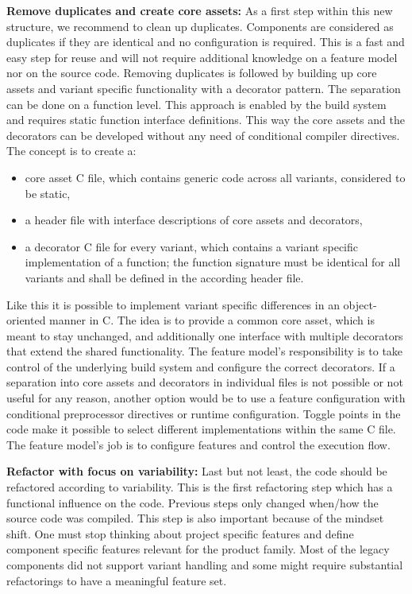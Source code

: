 \textbf{Remove duplicates and create core assets:} As a first step within this
new structure, we recommend to clean up duplicates. Components are considered as
duplicates if they are identical and no configuration is required. This is a
fast and easy step for reuse and will not require additional knowledge on a
feature model nor on the source code. Removing duplicates is followed by
building up core assets and variant specific functionality with a decorator
pattern. The separation can be done on a function level. This approach is
enabled by the build system and requires static function interface definitions.
This way the core assets and the decorators can be developed without any need of
conditional compiler directives. The concept is to create a:
\begin{itemize}
  \item core asset C file, which contains generic code across all variants,
        considered to be static,
  \item a header file with interface descriptions of core assets and decorators,
  \item a decorator C file for every variant, which contains a variant specific
        implementation of a function; the function signature must be identical
        for all variants and shall be defined in the according header file.
\end{itemize}
Like this it is possible to implement variant specific differences in an
object-oriented manner in C. The idea is to provide a common core asset, which
is meant to stay unchanged, and additionally one interface with multiple
decorators that extend the shared functionality. The feature model's
responsibility is to take control of the underlying build system and configure
the correct decorators. If a separation into core assets and decorators in
individual files is not possible or not useful for any reason, another option
would be to use a feature configuration with conditional preprocessor directives
or runtime configuration. Toggle points in the code make it possible to select
different implementations within the same C file. The feature model's job is to
configure features and control the execution flow.

\textbf{Refactor with focus on variability:} Last but not least, the code should
be refactored according to variability. This is the first refactoring step which
has a functional influence on the code. Previous steps only changed when/how the
source code was compiled. This step is also important because of the mindset
shift. One must stop thinking about project specific features and define
component specific features relevant for the product family. Most of the legacy
components did not support variant handling and some might require substantial
refactorings to have a meaningful feature set.


